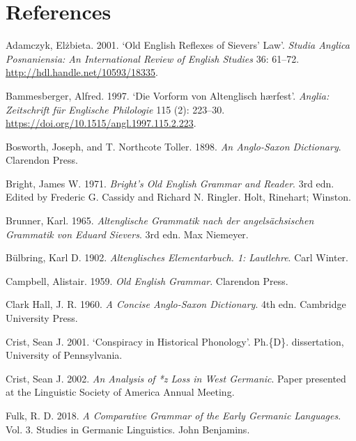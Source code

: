 \documentclass[
  british,
  a4paper,
  openany]{book}
\newlength{\cslhangindent}
\newenvironment{CSLReferences}[2] %
 {\begin{list}{}{%
  \setlength{\itemindent}{0pt}
  \setlength{\leftmargin}{0pt}
  \setlength{\parsep}{0pt}
  \ifodd #1
   \setlength{\leftmargin}{\cslhangindent}
   \setlength{\itemindent}{-1\cslhangindent}
  \fi
  \setlength{\itemsep}{#2\baselineskip}}}
 {\end{list}}
\begin{document}
\backmatter

\chapter{References}\label{references-1}

\protect{}\label{refs}
\begin{CSLReferences}{1}{1}
Adamczyk, Elżbieta. 2001. {`Old {English} Reflexes of {Sievers'} Law'}.
\emph{Studia Anglica Posnaniensia: An International Review of English
Studies} 36: 61--72. \url{http://hdl.handle.net/10593/18335}.

Bammesberger, Alfred. 1997. {`Die Vorform von Altenglisch {h{æ}rfest}'}.
\emph{Anglia: Zeitschrift f{ü}r Englische Philologie} 115 (2): 223--30.
\url{https://doi.org/10.1515/angl.1997.115.2.223}.

Bosworth, Joseph, and T. Northcote Toller. 1898. \emph{An {Anglo-Saxon}
Dictionary}. Clarendon Press.

Bright, James W. 1971. \emph{Bright's {Old English} Grammar and Reader}.
3rd edn. Edited by Frederic G. Cassidy and Richard N. Ringler. Holt,
Rinehart; Winston.

Brunner, Karl. 1965. \emph{{Altenglische Grammatik nach der
angels{ä}chsischen Grammatik von Eduard Sievers}}. 3rd edn. Max
Niemeyer.

Bülbring, Karl D. 1902. \emph{Altenglisches Elementarbuch. 1:
Lautlehre}. Carl Winter.

Campbell, Alistair. 1959. \emph{Old {English} Grammar}. Clarendon Press.

Clark Hall, J. R. 1960. \emph{A Concise {Anglo-Saxon} Dictionary}. 4th
edn. Cambridge University Press.

Crist, Sean J. 2001. {`Conspiracy in Historical Phonology'}. Ph.\{D\}.
dissertation, University of Pennsylvania.

Crist, Sean J. 2002. \emph{An Analysis of *{z} Loss in {West Germanic}}.
Paper presented at the Linguistic Society of America Annual Meeting.

Fulk, R. D. 2018. \emph{A Comparative Grammar of the Early {Germanic}
Languages}. Vol. 3. Studies in Germanic Linguistics. John Benjamins.


\end{CSLReferences}
\end{document}

